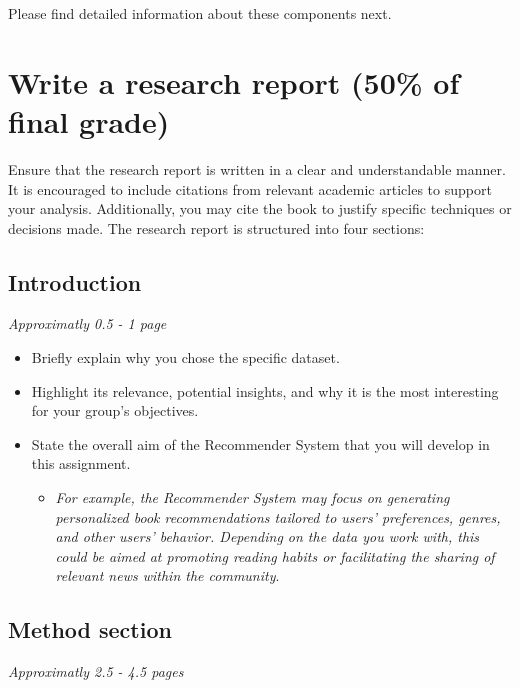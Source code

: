 Please find detailed information about these components next. 

\section{Write a research report (50\% of final grade)}

Ensure that the research report is written in a clear and understandable manner. It is encouraged to include citations from relevant academic articles to support your analysis. Additionally, you may cite the book \citep{van_atteveldt_computational_2022} to justify specific techniques or decisions made. The research report is structured into four sections:

\subsection{Introduction}
\textit{Approximatly 0.5 - 1 page}
\begin{itemize}
	\item Briefly explain why you chose the specific dataset. 
	\item Highlight its relevance, potential insights, and why it is the most interesting for your group's objectives.
	\item State the overall aim of the Recommender System that you will develop in this assignment.
	\begin{itemize}
		\item \emph{For example, the Recommender System may focus on generating personalized book recommendations tailored to users' preferences, genres, and other users' behavior. Depending on the data you work with, this could be aimed at promoting reading habits or facilitating the sharing of relevant news within the community}.
	\end{itemize}
\end{itemize}


\subsection{Method section}
\textit{Approximatly 2.5 - 4.5 pages}

